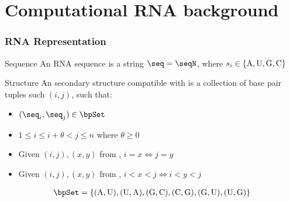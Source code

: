 \documentclass{beamer}
\begin{document}



\section{Computational RNA background}

\begin{frame}
  \frametitle{RNA Representation}
  \begin{block}{Sequence}
  An RNA sequence is a string $\seq = \seqN$, where $s_i \in \{\text{A,\,U,\,G,\,C}\}$
  \end{block}
  \begin{block}{Structure}
  An secondary structure \str compatible with \seq is a collection of base pair tuples such $(i,j)$, such that:
  \begin{itemize}
  \item $(\seq_i, \seq_j) \in \bpSet$
  \item $1 \le i \le i+\theta < j \le n$ where $\theta \ge 0$
  \item Given $(i,j), (x,y)$ from \str, $i=x \iff j=y$
  \item Given $(i,j), (x,y)$ from \str, $i<x<j \iff i<y<j$
  \end{itemize}
  \end{block}

  \begin{align*}
    \bpSet =
  \{\text{(A,\,U),\,(U,\,A),\,(G,\,C),\,(C,\,G),\,(G,\,U),\,(U,\,G)}\}
  \end{align*}
\end{frame}
\end{document}
